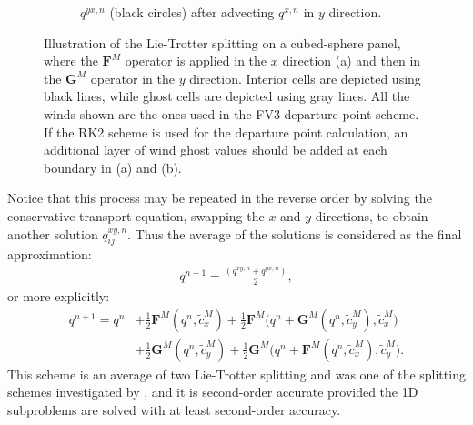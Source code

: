 \documentclass[preprint,12pt]{elsarticle}
\begin{document}
\begin{linenumbers}
\begin{figure}[!htb]
\begin{subfigure}{0.3\textwidth}
		\caption{$q^{yx,n}$ (black circles) after advecting $q^{x,n}$ in $y$ direction. \label{lt-GFQx}}
	\end{subfigure}
	\caption{Illustration of the Lie-Trotter splitting on a cubed-sphere panel, where the $\mathbf{F}^M$ operator is applied in the $x$ direction (a)
	and then in the $\mathbf{G}^M$ operator in the $y$ direction.
	Interior cells are depicted using black lines,
	while ghost cells are depicted using gray lines. 
	All the winds shown are the ones used in the FV3 departure point scheme.
	If the RK2 scheme is used for the departure point calculation, an additional layer of wind ghost values should be added at each boundary in (a) and (b). \label{ltxdir}}
\end{figure}

Notice that this process may be repeated in the reverse order by solving the conservative transport equation, swapping the $x$ and $y$ directions, to obtain another solution ${q}^{xy,n}_{ij}$.
Thus the average of the solutions is considered as the final approximation:
\begin{align}
	\label{lt-scheme0}
	{q}^{n+1} = \frac{({q}^{xy,n} + {q}^{yx,n})}{2},
\end{align}
or more explicitly:
\begin{align}
	\label{lt-scheme}
	{q}^{n+1} 
	= {q}^n &+ \frac{1}{2}\mathbf{F}^M({q}^n,\tilde{c}^{M}_x) +
	\frac{1}{2}\mathbf{F}^M\bigg({q}^n + \mathbf{G}^M({q}^n, \tilde{c}^{M}_y),\tilde{c}^{M}_x\bigg)\nonumber \\
	&+\frac{1}{2}\mathbf{G}^M({q}^n,\tilde{c}^{M}_y) + 
	\frac{1}{2}\mathbf{G}^M\bigg({q}^n + \mathbf{F}^M({q}^n, \tilde{c}^{M}_x), \tilde{c}^{M}_y\bigg).
\end{align}
This scheme is an average of two Lie-Trotter splitting
and was one of the splitting schemes investigated by \cite{strang:1968}, and it is second-order accurate provided the 1D subproblems are solved with at least second-order accuracy.


\end{linenumbers}
\end{document}
